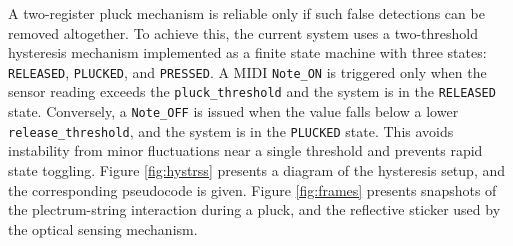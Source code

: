 A two-register pluck mechanism is reliable only if such false detections can be removed altogether. To achieve this, the current system uses a two-threshold hysteresis mechanism implemented as a finite state machine with three states: \texttt{RELEASED}, \texttt{PLUCKED}, and \texttt{PRESSED}. A MIDI \texttt{Note\_ON} is triggered only when the sensor reading exceeds the \texttt{pluck\_threshold} and the system is in the \texttt{RELEASED} state. Conversely, a \texttt{Note\_OFF} is issued when the value falls below a lower \texttt{release\_threshold}, and the system is in the \texttt{PLUCKED} state. This avoids instability from minor fluctuations near a single threshold and prevents rapid state toggling. Figure \ref{fig:hystrss} presents a diagram of the hysteresis setup, and the corresponding pseudocode is given. Figure \ref{fig:frames} presents snapshots of the plectrum-string interaction during a pluck, and the reflective sticker used by the optical sensing mechanism.
